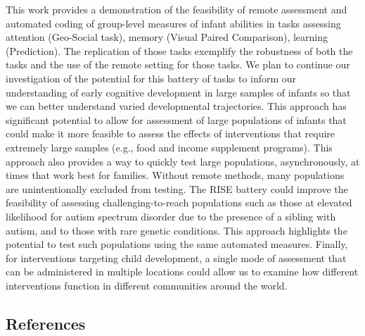 \documentclass[
  english,
  man,floatsintext]{apa6}
\begin{document}
This work provides a demonstration of the feasibility of remote assessment and automated coding of group-level measures of infant abilities in tasks assessing attention (Geo-Social task), memory (Visual Paired Comparison), learning (Prediction).
The replication of those tasks exemplify the robustness of both the tasks and the use of the remote setting for those tasks.
We plan to continue our investigation of the potential for this battery of tasks to inform our understanding of early cognitive development in large samples of infants so that we can better understand varied developmental trajectories.
This approach has significant potential to allow for assessment of large populations of infants that could make it more feasible to assess the effects of interventions that require extremely large samples (e.g., food and income supplement programs).
This approach also provides a way to quickly test large populations, asynchronously, at times that work best for families.
Without remote methods, many populations are unintentionally excluded from testing.
The RISE battery could improve the feasibility of assessing challenging-to-reach populations such as those at elevated likelihood for autism spectrum disorder due to the presence of a sibling with autism, and to those with rare genetic conditions.
This approach highlights the potential to test such populations using the same automated measures.
Finally, for interventions targeting child development, a single mode of assessment that can be administered in multiple locations could allow us to examine how different interventions function in different communities around the world.

\newpage

\subsection*{References}\label{references}
\end{document}
